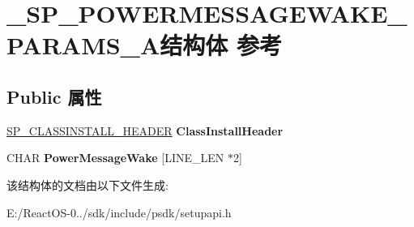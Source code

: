 \hypertarget{struct___s_p___p_o_w_e_r_m_e_s_s_a_g_e_w_a_k_e___p_a_r_a_m_s___a}{}\section{\+\_\+\+S\+P\+\_\+\+P\+O\+W\+E\+R\+M\+E\+S\+S\+A\+G\+E\+W\+A\+K\+E\+\_\+\+P\+A\+R\+A\+M\+S\+\_\+\+A结构体 参考}
\label{struct___s_p___p_o_w_e_r_m_e_s_s_a_g_e_w_a_k_e___p_a_r_a_m_s___a}
\subsection*{Public 属性}
\begin{DoxyCompactItemize}
\item 
\mbox{\label{struct___s_p___p_o_w_e_r_m_e_s_s_a_g_e_w_a_k_e___p_a_r_a_m_s___a_afa35412bc24d783169342a9aa8b2585c}} 
\hyperlink{struct___s_p___c_l_a_s_s_i_n_s_t_a_l_l___h_e_a_d_e_r}{S\+P\+\_\+\+C\+L\+A\+S\+S\+I\+N\+S\+T\+A\+L\+L\+\_\+\+H\+E\+A\+D\+ER} {\bfseries Class\+Install\+Header}
\item 
\mbox{\label{struct___s_p___p_o_w_e_r_m_e_s_s_a_g_e_w_a_k_e___p_a_r_a_m_s___a_a8e9c24f1caf297590c12d937fbb74176}} 
C\+H\+AR {\bfseries Power\+Message\+Wake} \mbox{[}L\+I\+N\+E\+\_\+\+L\+EN $\ast$2\mbox{]}
\end{DoxyCompactItemize}


该结构体的文档由以下文件生成\+:\begin{DoxyCompactItemize}
\item 
E\+:/\+React\+O\+S-\/0../sdk/include/psdk/setupapi.\+h\end{DoxyCompactItemize}
